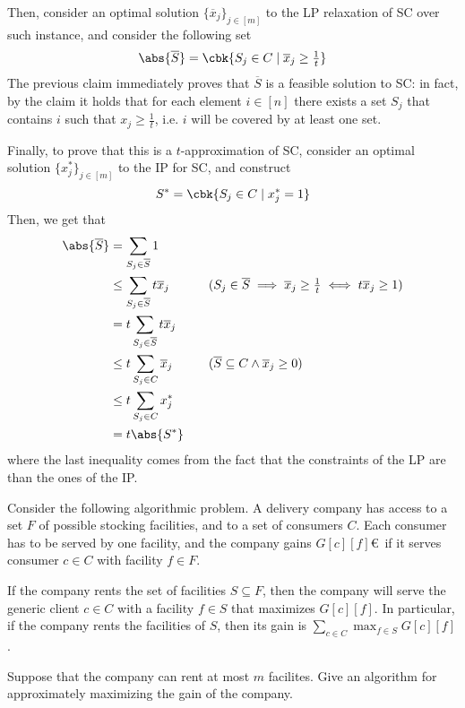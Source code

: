 \documentclass[a4paper, 12pt]{report}
\begin{document}
{        Then, consider an optimal solution $\{\overline x_j\}_{j \in [m]}$ to the LP relaxation of SC over such instance, and consider the following set $$\abs{\overline S} = \cbk{S_j \in C \mid \overline x_j \ge \tfrac{1}{t}}$$ The previous claim immediately proves that $\overline S$ is a feasible solution to SC: in fact, by the claim it holds that for each element $i \in [n]$ there exists a set $S_j$ that contains $i$ such that $x_j \ge \tfrac{1}{t}$, i.e. $i$ will be covered by at least one set.

        Finally, to prove that this is a $t$-approximation of SC, consider an optimal solution $\{x^*_j\}_{j \in [m]}$ to the IP for SC, and construct $$S^* = \cbk{S_j \in C \mid x_j^* = 1}$$ Then, we get that
        \begin{equation*}
            \begin{alignedat}{2}
                \abs{\overline S} &= \sum_{S_j \in \overline S}{1} && \\
                                  &\le \sum_{S_j \in \overline S}{t \overline x_j} && \quad \quad (S_j \in \overline S \implies \overline x_j \ge \tfrac{1}{t} \iff t \overline x_j \ge 1) \\
                                  &= t \sum_{S_j \in \overline S}{t \overline x_j} && \\
                                  &\le t \sum_{S_j \in C}{\overline x_j} && \quad \quad (\overline S \subseteq C \land \overline x_j \ge 0) \\
                                  &\le t \sum_{S_j \in C}{x^*_j} \\
                                  &= t \abs{S^*}
            \end{alignedat}
        \end{equation*}
        where the last inequality comes from the fact that the constraints of the LP are  than the ones of the IP.
    }

    \begin{framedprob}{}
        Consider the following algorithmic problem. A delivery company has access to a set $F$ of possible stocking facilities, and to a set of consumers $C$. Each consumer has to be served by one facility, and the company gains $G[c][f]$\euro \ if it serves consumer $c \in C$ with facility $f \in F$.

        If the company rents the set of facilities $S \subseteq F$, then the company will serve the generic client $c \in C$ with a facility $f \in S$ that maximizes $G[c][f]$. In particular, if the company rents the facilities of $S$, then its gain is $\sum_{c \in C}{\max_{f \in S}{G[c][f]}}$.

        Suppose that the company can rent at most $m$ facilites. Give an algorithm for approximately maximizing the gain of the company.
    \end{framedprob}
\end{document}
